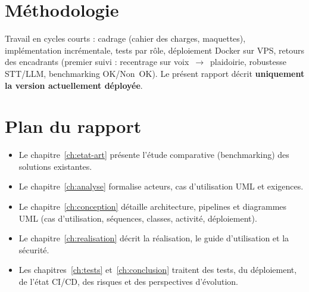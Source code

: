 \section{Méthodologie}

Travail en cycles courts : cadrage (cahier des charges, maquettes), implémentation incrémentale, tests par rôle, déploiement Docker sur VPS, retours des encadrants (premier suivi : recentrage sur voix~$\rightarrow$~plaidoirie, robustesse STT/LLM, benchmarking OK/Non~OK). Le présent rapport décrit \textbf{uniquement la version actuellement déployée}.

\section{Plan du rapport}

\begin{itemize}[leftmargin=1.4em]
  \item Le chapitre~\ref{ch:etat-art} présente l'étude comparative (benchmarking) des solutions existantes.
  \item Le chapitre~\ref{ch:analyse} formalise acteurs, cas d'utilisation UML et exigences.
  \item Le chapitre~\ref{ch:conception} détaille architecture, pipelines et diagrammes UML (cas d'utilisation, séquences, classes, activité, déploiement).
  \item Le chapitre~\ref{ch:realisation} décrit la réalisation, le guide d'utilisation et la sécurité.
  \item Les chapitres~\ref{ch:tests} et~\ref{ch:conclusion} traitent des tests, du déploiement, de l'état CI/CD, des risques et des perspectives d'évolution.
\end{itemize}
